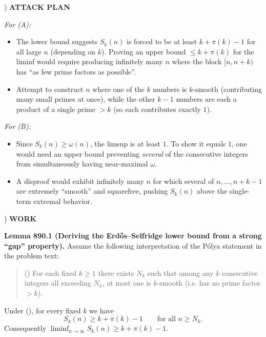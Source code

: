) \textbf{ATTACK PLAN}

\noindent \emph{For (A):}
\begin{itemize}
\item The lower bound suggests $S_k(n)$ is forced to be at least $k+\pi(k)-1$ for all large $n$ (depending on $k$). Proving an upper bound $\le k+\pi(k)$ for the liminf would require producing infinitely many $n$ where the block $[n,n+k)$ has ``as few prime factors as possible''.
\item Attempt to construct $n$ where one of the $k$ numbers is $k$-smooth (contributing many small primes at once), while the other $k-1$ numbers are each a product of a single prime $>k$ (so each contributes exactly $1$).
\end{itemize}

\noindent \emph{For (B):}
\begin{itemize}
\item Since $S_k(n)\ge \omega(n)$, the limsup is at least $1$. To show it equals $1$, one would need an upper bound preventing \emph{several} of the consecutive integers from simultaneously having near-maximal $\omega$.
\item A disproof would exhibit infinitely many $n$ for which several of $n,\dots,n+k-1$ are extremely ``smooth'' and squarefree, pushing $S_k(n)$ above the single-term extremal behavior.
\end{itemize}

) \textbf{WORK}

\noindent \textbf{Lemma 890.1 (Deriving the Erd\H{o}s--Selfridge lower bound from a strong ``gap'' property).}
Assume the following interpretation of the P\'{o}lya statement in the problem text:

\begin{quote}
(\*) For each fixed $k\ge 1$ there exists $N_k$ such that among any $k$ consecutive integers all exceeding $N_k$, at most one is $k$-smooth (i.e. has no prime factor $>k$).
\end{quote}

\noindent Under (\*), for every fixed $k$ we have
\[
S_k(n) \ge k+\pi(k)-1\qquad\text{for all }n\ge N_k.
\]
Consequently $\liminf_{n\to\infty} S_k(n)\ge k+\pi(k)-1$.

